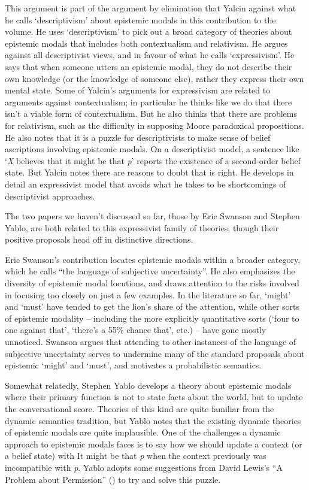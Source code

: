 \documentclass[
  11pt,
  letterpaper,
  DIV=11,
  numbers=noendperiod,
  twoside]{scrartcl}
\begin{document}
This argument is part of the argument by elimination that Yalcin against
what he calls `descriptivism' about epistemic modals in this
contribution to the volume. He uses `descriptivism' to pick out a broad
category of theories about epistemic modals that includes both
contextualism and relativism. He argues against all descriptivist views,
and in favour of what he calls `expressivism'. He says that when someone
utters an epistemic modal, they do not describe their own knowledge (or
the knowledge of someone else), rather they express their own mental
state. Some of Yalcin's arguments for expressivism are related to
arguments against contextualism; in particular he thinks like we do that
there isn't a viable form of contextualism. But he also thinks that
there are problems for relativism, such as the difficulty in supposing
Moore paradoxical propositions. He also notes that it is a puzzle for
descriptivists to make sense of belief ascriptions involving epistemic
modals. On a descriptivist model, a sentence like `\emph{X} believes
that it might be that \emph{p}' reports the existence of a second-order
belief state. But Yalcin notes there are reasons to doubt that is right.
He develops in detail an expressivist model that avoids what he takes to
be shortcomings of descriptivist approaches.

The two papers we haven't discussed so far, those by Eric Swanson and
Stephen Yablo, are both related to this expressivist family of theories,
though their positive proposals head off in distinctive directions.

Eric Swanson's contribution locates epistemic modals within a broader
category, which he calls ``the language of subjective uncertainty''. He
also emphasizes the diversity of epistemic modal locutions, and draws
attention to the risks involved in focusing too closely on just a few
examples. In the literature so far, `might' and `must' have tended to
get the lion's share of the attention, while other sorts of epistemic
modality -- including the more explicitly quantitative sorts (`four to
one against that', `there's a 55\% chance that', etc.) -- have gone
mostly unnoticed. Swanson argues that attending to other instances of
the language of subjective uncertainty serves to undermine many of the
standard proposals about epistemic `might' and `must', and motivates a
probabilistic semantics.

Somewhat relatedly, Stephen Yablo develops a theory about epistemic
modals where their primary function is not to state facts about the
world, but to update the conversational score. Theories of this kind are
quite familiar from the dynamic semantics tradition, but Yablo notes
that the existing dynamic theories of epistemic modals are quite
implausible. One of the challenges a dynamic approach to epistemic
modals faces is to say how we should update a context (or a belief
state) with It might be that \emph{p} when the context previously was
incompatible with \emph{p}. Yablo adopts some suggestions from David
Lewis's ``A Problem about Permission'' () to try and solve this puzzle.
\end{document}
